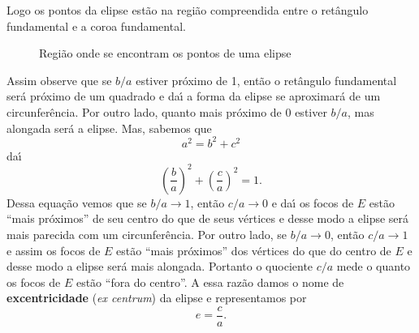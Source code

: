 Logo os pontos da elipse est\~ao na regi\~ao compreendida entre o ret\^angulo fundamental e a coroa fundamental.
\begin{figure}[!h]
  \centering
  \caption{Região onde se encontram os pontos de uma elipse}
\end{figure}
Assim observe que se $b/a$ estiver pr\'oximo de 1, ent\~ao o ret\^angulo fundamental ser\'a pr\'oximo de um quadrado e da{\'\i} a forma da elipse se aproximar\'a de um circunfer\^encia. Por outro lado, quanto mais pr\'oximo de 0 estiver $b/a$, mas alongada ser\'a a elipse. Mas, sabemos que
\[
  a^2 = b^2 + c^2
\]
da{\'\i}
\[
  \left(\dfrac{b}{a}\right)^2 + \left(\dfrac{c}{a}\right)^2 = 1.
\]
Dessa equa\c{c}\~ao vemos que se $b/a \to 1$, ent\~ao $c/a \to 0$ e da{\'\i} os focos de $E$ est\~ao ``mais pr\'oximos'' de seu centro do que de seus v\'ertices e desse modo a elipse ser\'a mais parecida com um circunfer\^encia. Por outro lado, se $b/a \to 0$, ent\~ao $c/a \to 1$ e assim os focos de $E$ est\~ao ``mais pr\'oximos'' dos v\'ertices do que do centro de $E$ e desse modo a elipse ser\'a mais alongada.  Portanto o quociente $c/a$ mede o quanto os focos de $E$ est\~ao ``fora do centro''. A essa raz\~ao damos o nome de \textbf{excentricidade} (\textit{ex centrum}) da elipse e representamos por
\[
  e = \dfrac{c}{a}.
\]


